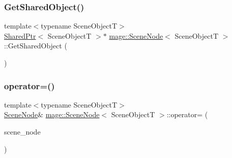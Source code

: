 \hypertarget{classmage_1_1_scene_node_aee3e06bc2c0979f01678ee96149c2607}{}\label{classmage_1_1_scene_node_aee3e06bc2c0979f01678ee96149c2607} 
\subsubsection{\texorpdfstring{Get\+Shared\+Object()}{GetSharedObject()}}
{\footnotesize\ttfamily template$<$typename Scene\+ObjectT$>$ \\
\hyperlink{namespacemage_a1e01ae66713838a7a67d30e44c67703e}{Shared\+Ptr}$<$ Scene\+ObjectT $>$$\ast$ \hyperlink{classmage_1_1_scene_node}{mage\+::\+Scene\+Node}$<$ Scene\+ObjectT $>$\+::Get\+Shared\+Object (\begin{DoxyParamCaption}{ }\end{DoxyParamCaption})}

\hypertarget{classmage_1_1_scene_node_a64c931d2d33ec110575b0a7659c41bdb}{}\label{classmage_1_1_scene_node_a64c931d2d33ec110575b0a7659c41bdb} 
\subsubsection{\texorpdfstring{operator=()}{operator=()}\hspace{0.1cm}{\footnotesize\ttfamily [1/2]}}
{\footnotesize\ttfamily template$<$typename Scene\+ObjectT$>$ \\
\hyperlink{classmage_1_1_scene_node}{Scene\+Node}\& \hyperlink{classmage_1_1_scene_node}{mage\+::\+Scene\+Node}$<$ Scene\+ObjectT $>$\+::operator= (\begin{DoxyParamCaption}\item[{const \hyperlink{classmage_1_1_scene_node}{Scene\+Node}$<$ Scene\+ObjectT $>$ \&}]{scene\+\_\+node }\end{DoxyParamCaption})\hspace{0.3cm}{\ttfamily [delete]}}

\hypertarget{classmage_1_1_scene_node_a5fe1aa53e7ac43653483af8397ce78a9}{}\label{classmage_1_1_scene_node_a5fe1aa53e7ac43653483af8397ce78a9} 
